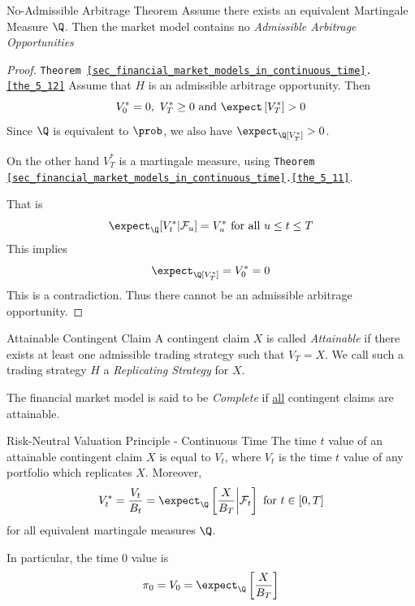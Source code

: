 \documentclass[11pt,a4paper]{article}
\begin{document}
  \begin{theorem}{No-Admissible Arbitrage Theorem}\label{the_5_12}
    Assume there exists an equivalent Martingale Measure $\Q$. Then the market model contains no \textit{Admissible Arbitrage Opportunities}
  \end{theorem}

  \begin{proof}{\texttt{Theorem \ref{sec_financial_market_models_in_continuous_time}.\ref{the_5_12}}}
    Assume that $H$ is an admissible arbitrage opportunity. Then
    \[ V_0^*=0,\ V_T^*\geq0\text{ and }\expect\left[V_T^*\right]>0 \]
    Since $\Q$ is equivalent to $\prob$, we also have $\expect_\Q[V_T^*]>0$.
    \par On the other hand $V_T^*$ is a martingale measure, using \texttt{Theorem \ref{sec_financial_market_models_in_continuous_time}.\ref{the_5_11}}.
    \par That is
    \[ \expect_\Q[V_t^*|\mathcal{F}_u]=V_u^*\text{ for all }u\leq t\leq T \]
    This implies
    \[ \expect_\Q[V_T^*]=V_0^*=0 \]
    This is a contradiction. Thus there cannot be an admissible arbitrage opportunity.\proved
  \end{proof}

  \begin{definition}{Attainable Contingent Claim}
    A contingent claim $X$ is called \textit{Attainable} if there exists at least one admissible trading strategy such that $V_T=X$. We call such a trading strategy $H$ a \textit{Replicating Strategy} for $X$.
    \par The financial market model is said to be \textit{Complete} if \underline{all} contingent claims are attainable.
  \end{definition}

  \begin{theorem}{Risk-Neutral Valuation Principle - Continuous Time}\label{the_risk_netural_valuation_principle_continuous_time}
    The time $t$ value of an attainable contingent claim $X$ is equal to $V_t$, where $V_t$ is the time $t$ value of any portfolio which replicates $X$. Moreover,
    \[ V_t^*=\frac{V_t}{B_t}=\expect_\Q\left[\frac{X}{B_T}\bigg|\mathcal{F}_t\right]\text{ for }t\in[0,T] \]
    for all equivalent martingale measures $\Q$.
    \par In particular, the time $0$ value is
    \[ \pi_0=V_0=\expect_\Q\left[\frac{X}{B_T}\right] \]
  \end{theorem}
\end{document}
